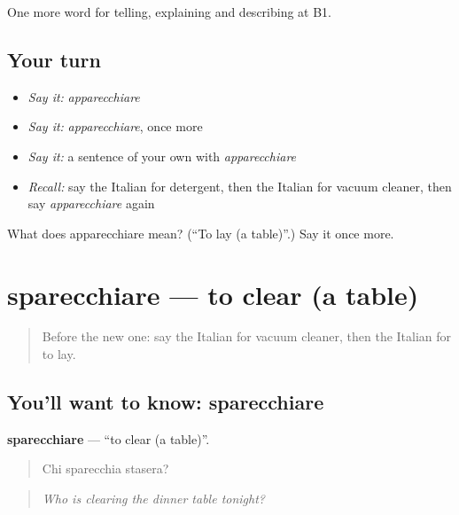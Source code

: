\begin{grammarlens}[title={What you've built}]
One more word for telling, explaining and describing at B1.
\end{grammarlens}

\subsection*{Your turn}
\begin{itemize}
\raggedright
  \item \emph{Say it:} \emph{apparecchiare}
  \item \emph{Say it:} \emph{apparecchiare}, once more
  \item \emph{Say it:} a sentence of your own with \emph{apparecchiare}
  \item \emph{Recall:} say the Italian for detergent, then the Italian for vacuum cleaner, then say \emph{apparecchiare} again
\end{itemize}

\begin{tcolorbox}[breakable,colback=teal!4,colframe=teal!35!black,title={Before you move on}]
What does apparecchiare mean? (\textquotedblleft{}To lay (a table)\textquotedblright{}.) Say it once more.
\end{tcolorbox}
\section[sparecchiare]{sparecchiare — to clear (a table)}

\label{lesson:IT-C533-sparecchiare}



\begin{quote}
Before the new one: say the Italian for vacuum cleaner, then the Italian for to lay.
\end{quote}

\subsection*{You'll want to know: sparecchiare}
\textbf{sparecchiare} — \textquotedblleft{}to clear (a table)\textquotedblright{}.

\begin{quote}
Chi sparecchia stasera?
\end{quote}

\begin{quote}
\emph{Who is clearing the dinner table tonight?}
\end{quote}

